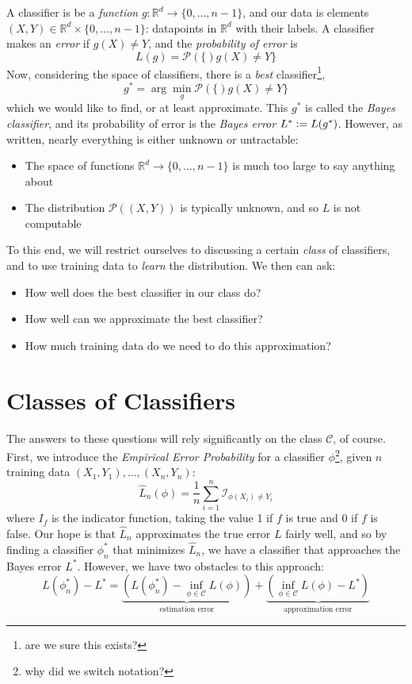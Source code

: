 \documentclass[11pt]{article} %
\renewcommand{\Pr}[1]{\mathcal{P} \left( #1 \right)}
\newcommand{\cls}{\mathcal{C}}
\newcommand{\R}{\mathbb{R}}
\newcommand{\defeq}{\vcentcolon=}
\newcommand{\pa}[1]{\left( #1 \right)}
\newcommand{\I}{\mathcal{I}}
\begin{document}
A classifier is be a \emph{function} $g: \R^d \to \{0,\ldots,n-1\}$, and our data is elements  $(X,Y) \in \R^d \times \{0,\ldots,n-1\}$: datapoints in $\R^d$ with their labels. A classifier makes an \emph{error} if $g(X) \ne Y$, and the \emph{probability of error} is
\[ L(g) = \Pr\{g(X) \ne Y\} \]
Now, considering the space of classifiers, there is a \emph{best} classifier\footnote{are we sure this exists?},
\[ g^* = \arg\min_{g} \Pr\{g(X) \ne Y\} \]
which we would like to find, or at least approximate. This $g^*$ is called the \emph{Bayes classifier}, and its probability of error is the \emph{Bayes error} $L^* \defeq L(g^*)$. However, as written, nearly everything is either unknown or untractable:
\begin{itemize}
\item The space of functions $\R^d \to \{0,\ldots,n-1\}$ is much too large to say anything about
\item The distribution $\Pr{(X,Y)}$ is typically unknown, and so $L$ is not computable
\end{itemize}
To this end, we will restrict ourselves to discussing a certain \emph{class} of classifiers, and to use training data to \emph{learn} the distribution. We then can ask:
\begin{itemize}
\item How well does the best classifier in our class do?
\item How well can we approximate the best classifier?
\item How much training data do we need to do this approximation?
\end{itemize}

\section{Classes of Classifiers}

The answers to these questions will rely significantly on the class $\mathcal{C}$, of course. First, we introduce the \emph{Empirical Error Probability} for a classifier $\phi$\footnote{why did we switch notation?}, given $n$ training data $(X_1,Y_1),\ldots,(X_n, Y_n)$:
\[ \hat{L}_n(\phi) = \frac1n \sum_{i=1}^n \I_{\phi(X_i) \ne Y_i} \]
where $I_f$ is the indicator function, taking the value 1 if $f$ is true and $0$ if $f$ is false. Our hope is that $\hat{L}_n$ approximates the true error $L$ fairly well, and so by finding a classifier $\phi^*_n$ that minimizes $\hat{L}_n$, we have a classifier that approaches the Bayes error $L^*$. However, we have two obstacles to this approach:
\[ L(\phi_n^*) - L^* = \underbrace{\pa{ L(\phi_n^*) - \inf_{\phi \in \cls} L(\phi)}}_{\text{estimation error}} + \underbrace{\pa{ \inf_{\phi \in \cls} L(\phi) - L^*}}_{\text{approximation error}} \]
\end{document}

